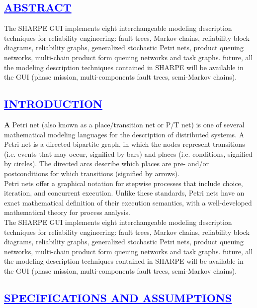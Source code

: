 \documentclass[a4paper,12pt]{report}
\begin{document}
\begin{center}
\chapter{\textcolor{blue}{\underline {ABSTRACT}}}
\end{center}
\noindent The SHARPE GUI implements eight interchangeable modeling description
techniques for reliability engineering: fault trees, Markov chains, reliability
block diagrams, reliability graphs, generalized stochastic Petri nets,
product queuing networks, multi-chain product form queuing networks
and task graphs. future, all the modeling description techniques contained
in SHARPE will be available in the GUI (phase mission, multi-components
fault trees, semi-Markov chains).
\begin{center}
\chapter{\textcolor{blue}{\underline {INTRODUCTION}}}
\end{center}
\noindent \textbf A Petri net (also known as a place/transition net or P/T net) is one of several mathematical 
modeling languages for the description of distributed systems. A Petri net is a directed bipartite graph, 
in which the nodes represent transitions (i.e. events that may occur, signified by bars) and places 
(i.e. conditions, signified by circles). The directed arcs describe which places are pre- and/or 
postconditions for which transitions (signified by arrows).\\

   Petri nets offer a graphical notation for stepwise processes that include choice, iteration, 
and concurrent execution. Unlike these standards, Petri nets have an exact mathematical definition
of their execution semantics, with a well-developed mathematical theory for process analysis.\\

The SHARPE GUI implements eight interchangeable modeling description
techniques for reliability engineering: fault trees, Markov chains, reliability
block diagrams, reliability graphs, generalized stochastic Petri nets,
product queuing networks, multi-chain product form queuing networks
and task graphs. future, all the modeling description techniques contained
in SHARPE will be available in the GUI (phase mission, multi-components
fault trees, semi-Markov chains).

\begin{center}
\chapter{\textcolor{blue}{\underline {SPECIFICATIONS AND ASSUMPTIONS}}}
\end{center}
\end{document}
